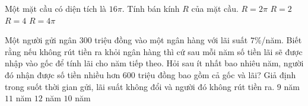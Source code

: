 \begin{ex}%
	Một mặt cầu có diện tích là $16\pi$. Tính bán kính $R$ của mặt cầu. 	
	\choice
	{ $R=2\pi$}
	{\True $R=2$}
	{ $R=4$}
	{ $R=4\pi$}
	
\end{ex} 

\begin{ex}%
Một người gửi ngân $300$ triệu đồng vào một ngân hàng với lãi suất $7\%$/năm. Biết rằng nếu không rút tiền ra khỏi ngân hàng thì cứ sau mỗi năm số tiền lãi sẽ được nhập vào gốc để tính lãi cho năm tiếp theo. Hỏi sau ít nhất bao nhiêu năm, người đó nhận được số tiền  nhiều hơn $600$ triệu đồng bao gồm cả gốc và lãi? Giả định trong suốt thời gian  gửi, lãi suất không đổi và người đó không rút tiền ra. 
\choice
{$9$ năm}
{\True$11$ năm}
{$12$ năm}
{ $10$ năm}
\end{ex}


